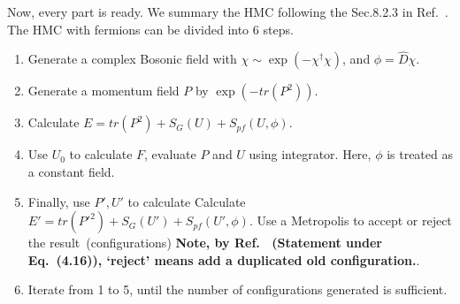 Now, every part is ready. We summary the HMC following the Sec.8.2.3 in Ref.~\cite{latticeqcdbook2010}. The HMC with fermions can be divided into 6 steps.

\begin{enumerate}
  \item Generate a complex Bosonic field with $\chi \sim \exp (-\chi ^{\dagger}\chi)$, and $\phi = \hat{D} \chi$.
  \item Generate a momentum field $P$ by $\exp (-tr(P^2))$.
  \item Calculate $E=tr(P^2)+S_G(U)+S_{pf}(U,\phi)$.
  \item Use $U_0$ to calculate $F$, evaluate $P$ and $U$ using integrator. Here, $\phi$ is treated as a constant field.
  \item Finally, use $P',U'$ to calculate Calculate $E'=tr({P'}^2)+S_G(U')+S_{pf}(U',\phi)$. Use a Metropolis to accept or reject the result~(configurations) \textbf{Note, by Ref.~\cite{latticeqcdbook2010} (Statement under Eq.~(4.16)), `reject' means add a duplicated old configuration.}.
  \item Iterate from 1 to 5, until the number of configurations generated is sufficient.
\end{enumerate}




